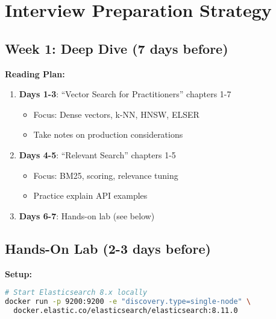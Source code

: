 \documentclass[10pt]{article}
\begin{document}
\section{Interview Preparation Strategy}

\subsection{Week 1: Deep Dive (7 days before)}

\textbf{Reading Plan:}
\begin{enumerate}
\item \textbf{Days 1-3}: ``Vector Search for Practitioners'' chapters 1-7
  \begin{itemize}
  \item Focus: Dense vectors, k-NN, HNSW, ELSER
  \item Take notes on production considerations
  \end{itemize}
\item \textbf{Days 4-5}: ``Relevant Search'' chapters 1-5
  \begin{itemize}
  \item Focus: BM25, scoring, relevance tuning
  \item Practice explain API examples
  \end{itemize}
\item \textbf{Days 6-7}: Hands-on lab (see below)
\end{enumerate}

\subsection{Hands-On Lab (2-3 days before)}

\textbf{Setup:}
\begin{lstlisting}[language=bash]
# Start Elasticsearch 8.x locally
docker run -p 9200:9200 -e "discovery.type=single-node" \
  docker.elastic.co/elasticsearch/elasticsearch:8.11.0
\end{lstlisting}
\end{document}
